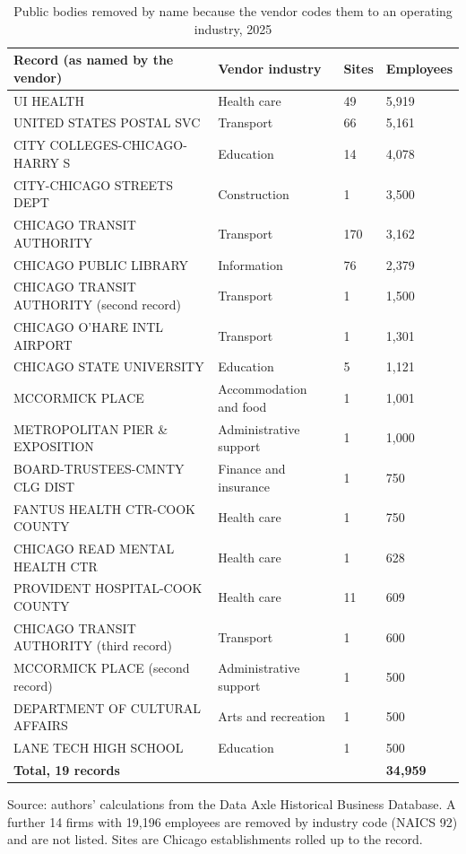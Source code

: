 \documentclass[12pt,letterpaper]{article}
\begin{document}
\begin{table}[H]
\centering
\caption{Public bodies removed by name because the vendor codes them to an operating industry, 2025}
\label{tab:govlist}
\footnotesize
\begin{tabular}{@{}L{2.9in}L{1.55in}C{0.7in}C{0.8in}@{}}
\toprule
\textbf{Record (as named by the vendor)} & \textbf{Vendor industry} & \textbf{Sites} & \textbf{Employees} \\
\midrule
UI HEALTH & Health care & 49 & 5,919 \\
UNITED STATES POSTAL SVC & Transport & 66 & 5,161 \\
CITY COLLEGES-CHICAGO-HARRY S & Education & 14 & 4,078 \\
CITY-CHICAGO STREETS DEPT & Construction & 1 & 3,500 \\
CHICAGO TRANSIT AUTHORITY & Transport & 170 & 3,162 \\
CHICAGO PUBLIC LIBRARY & Information & 76 & 2,379 \\
CHICAGO TRANSIT AUTHORITY (second record) & Transport & 1 & 1,500 \\
CHICAGO O'HARE INTL AIRPORT & Transport & 1 & 1,301 \\
CHICAGO STATE UNIVERSITY & Education & 5 & 1,121 \\
MCCORMICK PLACE & Accommodation and food & 1 & 1,001 \\
METROPOLITAN PIER \& EXPOSITION & Administrative support & 1 & 1,000 \\
BOARD-TRUSTEES-CMNTY CLG DIST & Finance and insurance & 1 & 750 \\
FANTUS HEALTH CTR-COOK COUNTY & Health care & 1 & 750 \\
CHICAGO READ MENTAL HEALTH CTR & Health care & 1 & 628 \\
PROVIDENT HOSPITAL-COOK COUNTY & Health care & 11 & 609 \\
CHICAGO TRANSIT AUTHORITY (third record) & Transport & 1 & 600 \\
MCCORMICK PLACE (second record) & Administrative support & 1 & 500 \\
DEPARTMENT OF CULTURAL AFFAIRS & Arts and recreation & 1 & 500 \\
LANE TECH HIGH SCHOOL & Education & 1 & 500 \\
\midrule
\textbf{Total, 19 records} & & & \textbf{34,959} \\
\bottomrule
\end{tabular}

\vspace{2pt}
{\footnotesize Source: authors' calculations from the Data Axle Historical Business Database. A further 14 firms with 19,196 employees are removed by industry code (NAICS 92) and are not listed. Sites are Chicago establishments rolled up to the record.}
\end{table}
\end{document}
